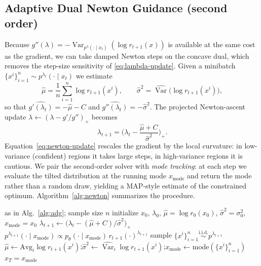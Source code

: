 \documentclass{article}
\DeclareMathOperator{\Var}{Var}
\newcommand{\qlam}{p^{\lambda}(\cdot\mid x_t)}
\begin{document}
\subsection{Adaptive Dual Newton Guidance (second order)}
Because $g''(\lambda)=-\Var_{\qlam}(\log r_{t+1}(x))$ is available at the same cost as the gradient, we can take damped Newton steps on the concave dual, which removes the step-size sensitivity of \eqref{eq:lambda-update}. Given a minibatch $\{x^i\}_{i=1}^n\sim p^{\lambda_t}(\cdot\mid x_t)$ we estimate
\begin{equation}
\widehat\mu=\frac1n\sum_{i=1}^n\log r_{t+1}(x^i),
\qquad
\widehat\sigma^2=\widehat{\Var}\big(\log r_{t+1}(x^i)\big),
\end{equation}
so that $\widehat{g'(\lambda_t)}=-\widehat\mu-C$ and $\widehat{g''(\lambda_t)}=-\widehat\sigma^2$. The projected Newton-ascent update $\lambda\!\leftarrow\!(\lambda-g'/g'')_+$ becomes
\begin{equation}
\label{eq:newton-update}
\lambda_{t+1}=\Big(\lambda_t-\frac{\widehat\mu+C}{\widehat\sigma^2}\Big)_{+}.
\end{equation}
Equation~\eqref{eq:newton-update} rescales the gradient by the local curvature: in low-variance (confident) regions it takes large steps, in high-variance regions it is cautious. We pair the second-order solver with \emph{mode tracking}: at each step we evaluate the tilted distribution at the running mode $x_{\mathrm{mode}}$ and return the mode rather than a random draw, yielding a MAP-style estimate of the constrained optimum. Algorithm~\ref{alg:newton} summarizes the procedure.

\begin{algorithm}[t]
\caption{Adaptive Dual Newton Guidance}
\label{alg:newton}
\begin{algorithmic}[1]
\Require as in Alg.~\ref{alg:adg}; sample size $n$
\State initialize $x_0$, $\lambda_0$, $\widehat\mu=\log r_0(x_0)$, $\widehat\sigma^2=\sigma_0^2$, $x_{\mathrm{mode}}=x_0$
  \State $\lambda_{t+1}\gets\big(\lambda_t-(\widehat\mu+C)/\widehat\sigma^2\big)_+$ 
  \State $p^{\lambda_{t+1}}(\cdot\mid x_{\mathrm{mode}})\propto p_\theta(\cdot\mid x_{\mathrm{mode}})\,r_{t+1}(\cdot)^{\lambda_{t+1}}$
  \State sample $\{x^i\}_{i=1}^n\stackrel{\text{i.i.d.}}{\sim}p^{\lambda_{t+1}}$
  \State $\widehat\mu\gets\mathrm{Avg}_i\log r_{t+1}(x^i)$;\quad $\widehat\sigma^2\gets\widehat{\Var}_i\log r_{t+1}(x^i)$;\quad $x_{\mathrm{mode}}\gets\mathrm{mode}(\{x^i\}_{i=1}^n)$
\EndFor
\State \Return $x_T=x_{\mathrm{mode}}$
\end{algorithmic}
\end{algorithm}
\end{document}
